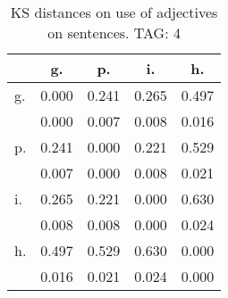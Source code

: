 \begin{table}[h!]
\begin{center}
\begin{tabular}{| l | c | c | c | c |}\hline
 & g. & p. & i. & h. \\\hline
g. & 0.000  & 0.241  & 0.265  & 0.497 \\\hline
 & 0.000  & 0.007  & 0.008  & 0.016 \\\hline
p. & 0.241  & 0.000  & 0.221  & 0.529 \\\hline
 & 0.007  & 0.000  & 0.008  & 0.021 \\\hline
i. & 0.265  & 0.221  & 0.000  & 0.630 \\\hline
 & 0.008  & 0.008  & 0.000  & 0.024 \\\hline
h. & 0.497  & 0.529  & 0.630  & 0.000 \\\hline
 & 0.016  & 0.021  & 0.024  & 0.000 \\\hline
\end{tabular}
\caption{KS distances on use of adjectives on sentences. TAG: 4}
\end{center}
\end{table}